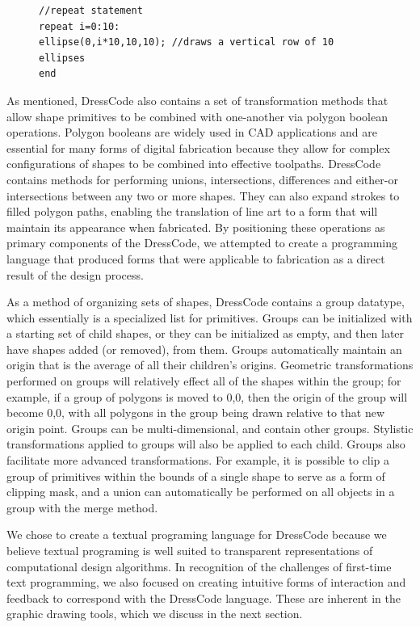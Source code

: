 \documentclass{sigchi}
\begin{document}
 \begin{center}
\begin{figure}
\begin{lstlisting}
//repeat statement
repeat i=0:10:
ellipse(0,i*10,10,10); //draws a vertical row of 10 ellipses
end
\end{lstlisting}
\end{figure}
\end{center}

As mentioned, DressCode also contains a set of transformation methods that allow shape primitives to be combined with one-another via polygon boolean operations. Polygon booleans are widely used in CAD applications and are essential for many forms of digital fabrication because they allow for complex configurations of shapes to be combined into effective toolpaths. DressCode contains methods for performing unions, intersections, differences and either-or intersections between any two or more shapes. They can also expand strokes to filled polygon paths, enabling the translation of line art to a form that will maintain its appearance when fabricated. By positioning these operations as primary components of the DressCode, we attempted to create a programming language that produced forms that were applicable to fabrication as a direct result of the design process. 

As a method of organizing sets of shapes, DressCode contains a group datatype, which essentially is a specialized list for primitives. Groups can be initialized with a starting set of child shapes, or they can be initialized as empty, and then later have shapes added (or removed), from them. Groups automatically maintain an origin that is the average of all their children's origins. Geometric transformations performed on groups will relatively effect all of the shapes within the group; for example, if a group of polygons is moved to 0,0, then the origin of the group will become 0,0, with all polygons in the group being drawn relative to that new origin point. Groups can be multi-dimensional, and contain other groups. Stylistic transformations applied to groups will also be applied to each child. Groups also facilitate more advanced transformations. For example, it is possible to clip a group of primitives within the bounds of a single shape to serve as a form of clipping mask, and a union can automatically be performed on all objects in a group with the merge method.

We chose to create a textual programing language for DressCode because we believe textual programing is well suited to transparent representations of computational design algorithms. In recognition of the challenges of first-time text programming, we also focused on creating intuitive forms of interaction and feedback to correspond with the DressCode language. These are inherent in the graphic drawing tools, which we discuss in the next section.
 
\end{document}

